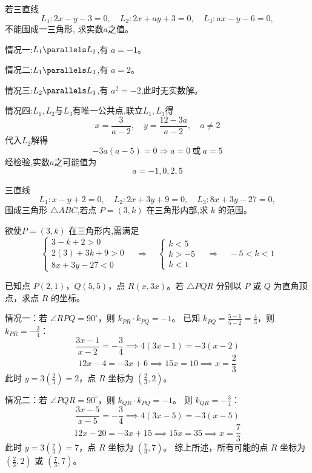 \begin{questions}
    \question 若三直线
    \[
    L_1: 2x-y-3=0, \quad L_2: 2x+ay+3=0, \quad L_3: ax-y-6=0,
    \]
    不能围成一三角形, 求实数$a$之值。
    \begin{solution}
        情况一:$L_1 \parallels L_2$,有 $a=-1$。

        情况二:$L_1 \parallels L_3$,有 $a=2$。

        情况三:$L_2 \parallels L_3$,有 $a^2=-2$,此时无实数解。

        情况四:$L_1,L_2$与$L_3$有唯一公共点,联立$L_1,L_3$得
        \[
        x=\frac{3}{a-2},\quad y=\frac{12-3a}{a-2}, \quad a \neq 2
        \]
        代入$L_2$解得
        \[
        -3a(a-5)=0 \Rightarrow a=0 \ \text{或} \ a=5
        \]
        经检验,实数$a$之可能值为
        \[
        a=-1,0,2,5
        \]
    \end{solution}

    \question 三直线
    \[
    L_1: x - y + 2 = 0, \quad L_2: 2x + 3y + 9 = 0, \quad L_3: 8x + 3y - 27 = 0,
    \]
    围成三角形 \(\triangle ABC\),若点 \(P = (3,k)\) 在三角形内部,求 \(k\) 的范围。
    \begin{solution}
        欲使\(P = (3,k)\) 在三角形内,需满足\[
        \begin{cases}
            3-k+2>0 \\ 2(3)+3k+9>0\\8x+3y-27<0
        \end{cases}\quad \Rightarrow \quad 
        \begin{cases}
            k<5 \\ k>-5\\k<1 
        \end{cases}\quad \Rightarrow \quad 
        -5<k<1\]
    \end{solution}

    \question 已知点 $P(2,1)$，$Q(5,5)$，点 $R(x, 3x)$。若 $\triangle PQR$ 分别以 $P$ 或 $Q$ 为直角顶点，求点 $R$ 的坐标。
\begin{solution}
情况一：若 $\angle RPQ = 90^\circ$，则 $k_{PR} \cdot k_{PQ} = -1$。
已知 $k_{PQ} = \frac{5-1}{5-2} = \frac{4}{3}$，则 $k_{PR} = -\frac{3}{4}$：
\[ \frac{3x - 1}{x - 2} = -\frac{3}{4} \implies 4(3x - 1) = -3(x - 2) \]
\[ 12x - 4 = -3x + 6 \implies 15x = 10 \implies x = \frac{2}{3} \]
此时 $y = 3(\frac{2}{3}) = 2$，点 $R$ 坐标为 $(\frac{2}{3}, 2)$。

情况二：若 $\angle PQR = 90^\circ$，则 $k_{QR} \cdot k_{PQ} = -1$。
则 $k_{QR} = -\frac{3}{4}$：
\[ \frac{3x - 5}{x - 5} = -\frac{3}{4} \implies 4(3x - 5) = -3(x - 5) \]
\[ 12x - 20 = -3x + 15 \implies 15x = 35 \implies x = \frac{7}{3} \]
此时 $y = 3(\frac{7}{3}) = 7$，点 $R$ 坐标为 $(\frac{7}{3}, 7)$。
综上所述，所有可能的点 $R$ 坐标为 $(\frac{2}{3}, 2)$ 或 $(\frac{7}{3}, 7)$。
\end{solution}
    

\end{questions}
